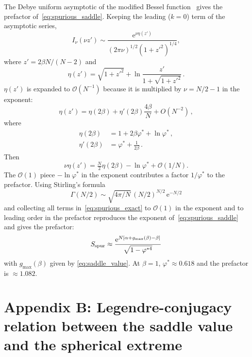 \documentclass[letterpaper]{article} %
\newcommand{\e}{{\mathrm{e}}}
\newcommand{\Bnet}{\beta}
\begin{document}
The Debye uniform asymptotic of the modified Bessel function~\citep[10.41.3]{olver2010nist}
gives the prefactor of~\eqref{eq:spurious_saddle}. Keeping the leading ($k = 0$) term of
the asymptotic series,
\begin{equation}
I_\nu(\nu z') \sim \frac{\e^{\nu\eta(z')}}{(2\pi\nu)^{1/2}(1+{z'}^2)^{1/4}},
\end{equation}
where $z' = 2\Bnet N/(N-2)$ and
\begin{equation}
    \eta(z') = \sqrt{1+{z'}^2} + \ln\frac{z'}{1+\sqrt{1+{z'}^2}}\,.
    \label{eq:bessel_debye}
\end{equation}  
$\eta(z')$ is expanded to $\mathcal{O}(N^{-1})$ because it is multiplied by
$\nu = N/2 - 1$ in the exponent:
\begin{equation}
    \eta(z') = \eta(2\Bnet) + \eta'(2\Bnet) \frac{4\Bnet}{N} + O(N^{-2})\,,
\end{equation}
where
\begin{align}
    \eta(2\Bnet)  &= 1 + 2\Bnet\varphi^* + \ln\varphi^*\,, \\
    \eta'(2\Bnet) &= \varphi^* + \frac{1}{2\Bnet}\,.
\end{align}
Then 
\begin{equation}
    \nu \eta(z') = \tfrac{N}{2} \eta(2\Bnet) - \ln\varphi^* + \mathcal{O}(1/N).
\end{equation}
The $\mathcal{O}(1)$ piece $-\ln\varphi^*$ in the exponent contributes a factor
$1/\varphi^*$ to the prefactor. Using Stirling's formula
\begin{equation}
    \Gamma(N/2) \sim \sqrt{4\pi/N}\,(N/2)^{N/2}\,\e^{-N/2}
\end{equation} 
and collecting all terms in~\eqref{eq:spurious_exact} to $\mathcal{O}(1)$ in the
exponent and to leading order in the prefactor reproduces the exponent
of~\eqref{eq:spurious_saddle} and gives the prefactor:
\begin{equation}
S_{\rm spur} \approx \frac{\e^{N[\alpha + g_{\max}(\Bnet) - \Bnet]}}{\sqrt{1-\varphi^{*4}}}
\label{eq:spurious_laplace}
\end{equation}
with $g_{\max}(\Bnet)$ given by \eqref{eq:saddle_value}.
At $\Bnet = 1$, $\varphi^* \approx 0.618$ and the prefactor is $\approx 1.082$.


\section{Appendix B: Legendre-conjugacy relation between the saddle value and the spherical extreme}
\end{document}
